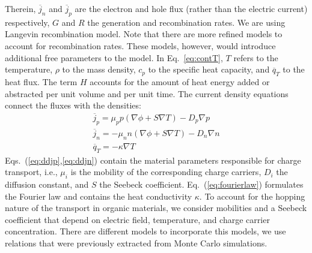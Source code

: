 \documentclass[%
9pt,
 aip,
rsi,%
 amsmath,amssymb,
preprint,%
]{revtex4-1}
\begin{document}
Therein, $\overline{j}_n$ and $\overline{j}_p$ are the electron and hole flux (rather than the electric current) respectively, $G$ and $R$ the generation and recombination rates. We are using Langevin recombination model.\cite{Langevin1903} 
Note that there are more refined models to account for recombination rates.\cite{Lee2014,VanDerHolst2009} These models, however, would introduce additional free parameters to the model.
In Eq.~\ref{eq:contT}, $T$ refers to the temperature, $\rho$ to the mass density, $c_p$ to the specific heat capacity, and  $\overline{q}_T$ to the heat flux.
The term $H$ accounts for the amount of heat energy added or abstracted per unit volume and per unit time. 
The current density equations connect the fluxes with the densities: 
\begin{subequations}
	\begin{gather}
		\overline{j}_p=\mu_p p \left(\nabla \phi + S \nabla T \right) - D_p \nabla p \label{eq:ddjp} \\
		\overline{j}_n=-\mu_n n \left(\nabla \phi + S \nabla T \right) - D_n \nabla n \label{eq:ddjn} \\
		\overline{q}_T=-\kappa \nabla T\qquad \label{eq:fourierlaw}
	\end{gather}
    \label{eq:connectionDensitiesToFluxes}
\end{subequations}
Eqs.~(\ref{eq:ddjp},\ref{eq:ddjn}) contain the material parameters responsible for charge transport, i.e., $\mu_i$ is the mobility of the corresponding charge carriers, $D_i$ the diffusion constant, and $S$ the Seebeck coefficient. Eq.~(\ref{eq:fourierlaw}) formulates the Fourier law and contains the heat conductivity $\kappa$.
To account for the hopping nature of the transport in organic materials, we consider mobilities and a Seebeck coefficient that  depend on electric field, temperature, and charge carrier concentration. 
There are different models to incorporate this models,\cite{Fishchuk2010,Fishchuk2013} we use relations that were previously extracted from Monte Carlo simulations.\cite{Lu2015,Pasveer2005}
\end{document}
